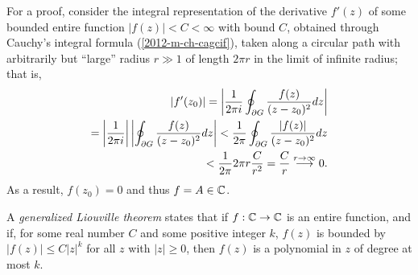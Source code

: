 {\color{OliveGreen}
\bproof
For a proof, consider the integral representation of the derivative $f'(z)$
of some bounded entire function $\vert f(z)\vert <C <\infty$ with bound $C$,
obtained through Cauchy's integral formula (\ref{2012-m-ch-cagcif}),
taken along a circular path with arbitrarily but ``large'' radius $r \gg 1$ of length $2\pi r$ in the limit of infinite radius;
that is,
 \begin{equation}
\begin{split}
\left| f'(z_0) \right| = \left|
{1\over 2\pi i}\oint_{\partial G}{f(z)\over
 (z-z_0)^{2}}dz
\right|   \\
=
\left|
{1\over 2\pi i}
\right|
\left|
\oint_{\partial G}{  f(z)  \over
 (z-z_0)^{2}}dz \right|
<
{1\over 2\pi }
\oint_{\partial G}{ \left| f(z)\right|  \over
 (z-z_0)^{2}}dz   \\
<  \frac{1}{2\pi } 2\pi r  \frac{C}{r^2}
=  \frac{C}{r} \stackrel{r\rightarrow \infty}{\longrightarrow} 0   .
\end{split}
 \end{equation}
As a result, $f(z_0)=0$ and thus $f = A \in {\Bbb C}$.
\eproof
}


A {\em generalized Liouville theorem}
states that if $f: {\Bbb C} \rightarrow {\Bbb C}$ is an entire function,
and if,
for some real number $C$ and some positive integer $k$, $f(z)$ is bounded by
$\vert f(z)\vert \le C \vert z \vert^k$ for all $z$ with $\vert z \vert \ge 0$,
then $f(z)$ is a polynomial in $z$ of degree at most $k$.

